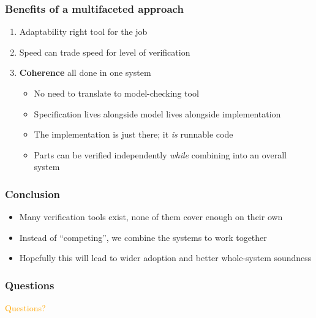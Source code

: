 \documentclass[compress,handout]{beamer}
\begin{document}
\begin{frame}
  \frametitle{Benefits of a multifaceted approach}

  \begin{enumerate}
    \item<1-> Adaptability {\textemdash} right tool for the job
    \item<2-> Speed {\textemdash} can trade speed for level of verification
    \item<3-> \textbf{Coherence} {\textemdash} all done in one system
      \begin{itemize}
        \item<4-> No need to translate to model-checking tool
        \item<5-> Specification lives alongside model lives alongside
                  implementation
        \item<6-> The implementation is just there; it \emph{is} runnable code
        \item<7-> Parts can be verified independently \emph{while} combining into an
                  overall system
      \end{itemize}
  \end{enumerate}

\end{frame}


\begin{frame}
  \frametitle{Conclusion}

  \begin{itemize}
    \item<1-> Many verification tools exist, none of them cover enough on their
              own
    \item<2-> Instead of ``competing'', we combine the systems to work together
    \item<3-> Hopefully this will lead to wider adoption and better whole-system
              soundness
  \end{itemize}

\end{frame}


\begin{frame}
  \frametitle{Questions}

  \begin{center}
    \textcolor<1>{orange}{\Large Questions?}
  \end{center}

\end{frame}

\end{document}
